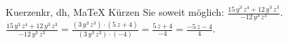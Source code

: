 \begin{MAufgabe}{Kuerzen}{kr, dh, MaTeX}
K\"urzen Sie soweit m\"oglich: $\frac{15\, y^3\, z^4 + 12\, y^3\, z^3}{- 12\, y^3\, z^3}$.\\ 
\ifLsg\MLoesung
\quad $\frac{15\, y^3\, z^4 + 12\, y^3\, z^3}{- 12\, y^3\, z^3}=\frac{(3\, y^3\, z^3)\cdot(5\, z + 4)}{(3\, y^3\, z^3)\cdot(-4)}=\frac{5\, z + 4}{-4}=\frac{ - 5\, z - 4}{4}$.\else\relax\fi
 \end{MAufgabe}